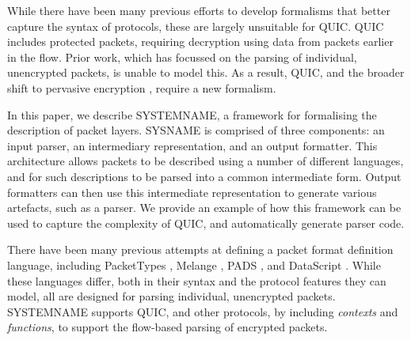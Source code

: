 \documentclass[10pt,sigconf]{acmart}
\begin{document}

While there have been many previous efforts to develop formalisms that better capture the
syntax of protocols, these are largely unsuitable for QUIC. QUIC includes protected
packets, requiring decryption using data from packets earlier in the flow. Prior work,
which has focussed on the parsing of individual, unencrypted packets, is unable to model
this. As a result, QUIC, and the broader shift to pervasive encryption \cite{rfc7258},
require a new formalism.


In this paper, we describe SYSTEMNAME, a framework for formalising the description of
packet layers. SYSNAME is comprised of three components: an input parser, an intermediary
representation, and an output formatter. This architecture allows packets to be described
using a number of different languages, and for such descriptions to be parsed into a
common intermediate form. Output formatters can then use this intermediate representation
to generate various artefacts, such as a parser. We provide an example of how this
framework can be used to capture the complexity of QUIC, and automatically generate parser
code.


There have been many previous attempts at defining a packet format definition language,
including PacketTypes \cite{mccann2000packet}, Melange \cite{madhavapeddy2007melange},
PADS \cite{fisher2005pads}, and DataScript \cite{back2002datascript}. While these
languages differ, both in their syntax and the protocol features they can model, all are
designed for parsing individual, unencrypted packets. SYSTEMNAME supports QUIC, and other
protocols, by including \emph{contexts} and \emph{functions}, to support the flow-based
parsing of encrypted packets.
\end{document}
